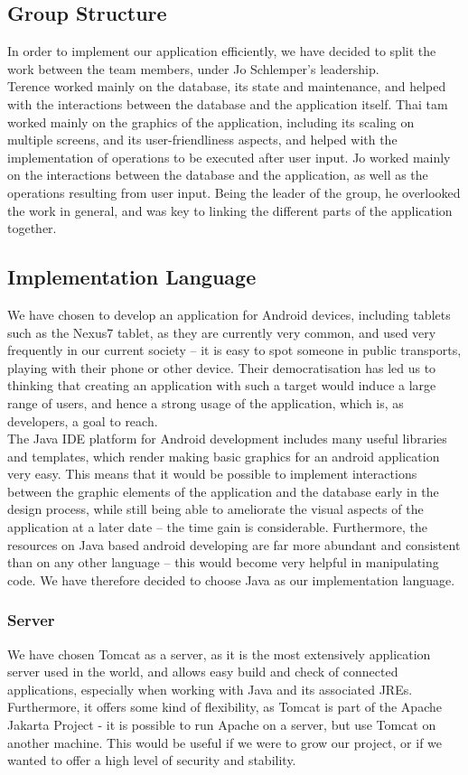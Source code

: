 \documentclass[a4paper,11pt]{article}
\begin{document}
\subsection*{Group Structure}
In order to implement our application efficiently, we have decided to split the work between the team members, under Jo Schlemper’s  leadership. \\
Terence worked mainly on the database, its state and maintenance, and helped with the interactions between the database and the application itself.
Thai tam worked mainly on the graphics of the application, including its scaling on multiple screens, and its user-friendliness aspects, and helped with the implementation of operations to be executed after user input.
Jo worked mainly on the interactions between the database and the application, as well as the operations resulting from user input. Being the leader of the group, he overlooked the work in general, and was key to linking the different parts of the application together.
 
\subsection*{Implementation Language}
We have chosen to develop an application for Android devices, including tablets such as the Nexus7 tablet, as they are currently very common, and used very frequently in our current society – it is easy to spot someone in public transports, playing with their phone or other device. Their democratisation has led us to thinking that creating an application with such a target would induce a large range of users, and hence a strong usage of the application, which is, as developers, a goal to reach. \\
The Java IDE platform for Android development includes many useful libraries and templates, which render making basic graphics for an android application very easy. This means that it would be possible to implement interactions between the graphic elements of the application and the database early in the design process, while still being able to ameliorate the visual aspects of the application at a later date – the time gain is considerable. Furthermore, the resources on Java based android developing are far more abundant and consistent than on any other language – this would become very helpful in manipulating code. We have therefore decided to choose Java as our implementation language.\\

\subsubsection*{Server}
We have chosen Tomcat as a server, as it is the most extensively application server used in the world, and allows easy build and check of connected applications, especially when working with Java and its associated JREs. Furthermore, it offers some kind of flexibility, as Tomcat is part of the Apache Jakarta Project - it is possible to run Apache on a server, but use Tomcat on another machine. This would be useful if we were to grow our project, or if we wanted to offer a high level of security and stability.
\end{document}
